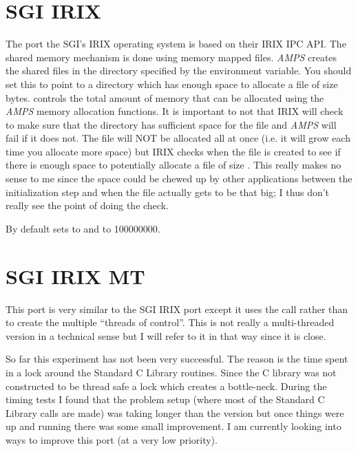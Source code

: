 \section{SGI IRIX}
\label{SGI IRIX}

The port the SGI's IRIX operating system is based on their IRIX IPC
API.  The shared memory mechanism is done using memory mapped files.
{\em AMPS} creates the shared files in the directory specified by the
 environment variable.  You should set this to
point to a directory which has enough space to allocate a file of size
 bytes.   controls the
total amount of memory that can be allocated using the {\em AMPS}
memory allocation functions.  It is important to not that IRIX will
check to make sure that the directory has sufficient space for the
file and {\em AMPS} will fail if it does not.  The file will NOT be
allocated all at once (i.e. it will grow each time you allocate more
space) but IRIX checks when the file is created to see if there is
enough space to potentially allocate a file of size
.  This really makes no sense to me since the
space could be chewed up by other applications between the
initialization step and when the file actually gets to be that big; I
thus don't really see the point of doing the check.

By default \parflow{} sets  to  and
 to 100000000.



\section{SGI IRIX MT}
\label{SGI IRIX MT}

This port is very similar to the SGI IRIX port except it uses
the  call rather than  to create the multiple
``threads of control''.  This is not really a multi-threaded version
in a technical sense but I will refer to it in that way since it is
close.

So far this experiment has not been very successful.  The reason is the
time spent in a lock around the Standard C Library routines.  Since
the C library was not constructed to be thread safe a lock which
creates a bottle-neck.  During the timing tests I found that the
problem setup (where most of the Standard C Library calls are made)
was taking longer than the  version but once things were up
and running there was some small improvement.  I am currently looking
into ways to improve this port (at a very low priority).

